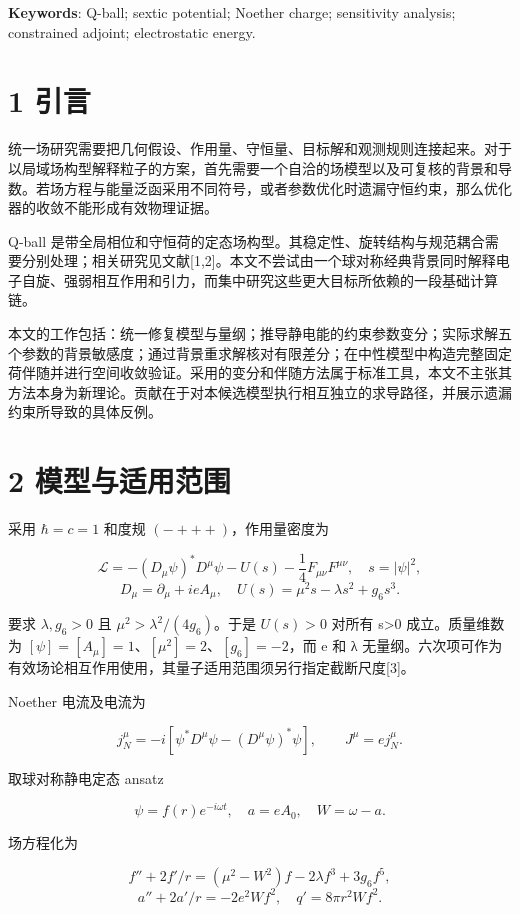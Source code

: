 \documentclass[UTF8,fontset=fandol,11pt]{ctexart}
\begin{document}
\textbf{Keywords}: Q-ball; sextic potential; Noether charge; sensitivity analysis; constrained adjoint; electrostatic energy.

\section*{1 引言}

统一场研究需要把几何假设、作用量、守恒量、目标解和观测规则连接起来。对于以局域场构型解释粒子的方案，首先需要一个自洽的场模型以及可复核的背景和导数。若场方程与能量泛函采用不同符号，或者参数优化时遗漏守恒约束，那么优化器的收敛不能形成有效物理证据。

Q-ball 是带全局相位和守恒荷的定态场构型。其稳定性、旋转结构与规范耦合需要分别处理；相关研究见文献[1,2]。本文不尝试由一个球对称经典背景同时解释电子自旋、强弱相互作用和引力，而集中研究这些更大目标所依赖的一段基础计算链。

本文的工作包括：统一修复模型与量纲；推导静电能的约束参数变分；实际求解五个参数的背景敏感度；通过背景重求解核对有限差分；在中性模型中构造完整固定荷伴随并进行空间收敛验证。采用的变分和伴随方法属于标准工具，本文不主张其方法本身为新理论。贡献在于对本候选模型执行相互独立的求导路径，并展示遗漏约束所导致的具体反例。

\section*{2 模型与适用范围}

采用 \(\hbar=c=1\) 和度规 \((-+++ )\)，作用量密度为

\[
\mathcal L=-(D_\mu\psi)^*D^\mu\psi-U(s)-\frac14F_{\mu\nu}F^{\mu\nu},
\quad s=|\psi|^2,
\tag{1}
\]
\[
D_\mu=\partial_\mu+ieA_\mu,
\quad U(s)=\mu^2s-\lambda s^2+g_6s^3.
\tag{2}
\]

要求 \(\lambda,g_6>0\) 且 \(\mu^2>\lambda^2/(4g_6)\)。于是 \(U(s)>0\) 对所有 s>0 成立。质量维数为 \([\psi]=[A_\mu]=1\)、\([\mu^2]=2\)、\([g_6]=-2\)，而 e 和 λ 无量纲。六次项可作为有效场论相互作用使用，其量子适用范围须另行指定截断尺度[3]。

Noether 电流及电流为

\[
j_N^\mu=-i[\psi^*D^\mu\psi-(D^\mu\psi)^*\psi],
\qquad J^\mu=e j_N^\mu.
\tag{3}
\]

取球对称静电定态 ansatz

\[
\psi=f(r)e^{-i\omega t},\quad a=eA_0,\quad W=\omega-a.
\tag{4}
\]

场方程化为

\[
f''+2f'/r=(\mu^2-W^2)f-2\lambda f^3+3g_6f^5,
\tag{5}
\]
\[
a''+2a'/r=-2e^2Wf^2,
\quad q'=8\pi r^2Wf^2.
\tag{6}
\]
\end{document}
